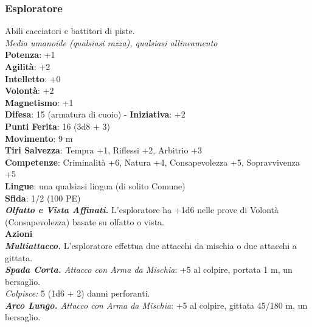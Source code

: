 \begin{multicols}{2}
\subsubsection{Esploratore}
Abili cacciatori e battitori di piste.\\
\emph{Media umanoide (qualsiasi razza), qualsiasi allineamento}\\
\textbf{Potenza}: +1\\
\textbf{Agilità}: +2\\
\textbf{Intelletto}: +0\\
\textbf{Volontà}: +2\\
\textbf{Magnetismo}: +1\\
\textbf{Difesa}: 15 (armatura di cuoio) - \textbf{Iniziativa}: +2\\
\textbf{Punti Ferita}: 16 (3d8 + 3)\\
\textbf{Movimento}: 9 m\\
\textbf{Tiri Salvezza}: Tempra +1, Riflessi +2, Arbitrio +3 \\
\textbf{Competenze}: Criminalità +6, Natura +4, Consapevolezza +5, Sopravvivenza +5\\
\textbf{Lingue}: una qualsiasi lingua (di solito Comune)\\
\textbf{Sfida}: 1/2 (100 PE)\smallskip\\
\emph{\textbf{Olfatto e Vista Affinati.}} L'esploratore ha +1d6 nelle prove di Volontà (Consapevolezza) basate su olfatto o vista.\\
\smallskip\textbf{Azioni}\\
\emph{\textbf{Multiattacco.}} L'esploratore effettua due attacchi da mischia o due attacchi a gittata.\\
\emph{\textbf{Spada Corta.} Attacco con Arma da Mischia}: +5 al colpire, portata 1 m, un bersaglio.\\
\emph{Colpisce:} 5 (1d6 + 2) danni perforanti.\\
\emph{\textbf{Arco Lungo.} Attacco con Arma da Mischia}: +5 al colpire, gittata 45/180 m, un bersaglio.\\

\end{multicols}
